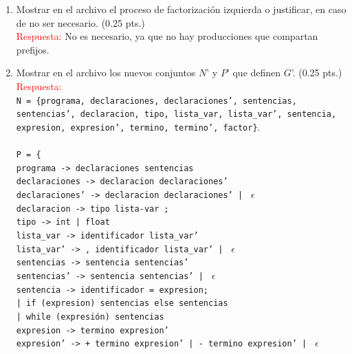 \documentclass[11pt]{report}
\begin{document}
\begin{enumerate}
\begin{enumerate}[label=\alph*.]
\begin{tabular}{ |p{13cm}|l| }
  \texttt{termino' -> * factor termino' |} / \texttt{factor termino' |} $\epsilon$. & $A'$ \texttt{->} $\alpha A'$ $|$ $\epsilon$ \\
  \hline
\end{tabular} \\
      \item Mostrar en el archivo el proceso de factorización izquierda o justificar, en caso de
  no ser necesario. (0.25 pts.) \\
        \textcolor{red}{Respuesta:} No es necesario, ya que no hay producciones que compartan prefijos.
      \item Mostrar en el archivo los nuevos conjuntos $N$' y $P$' que definen $G$'. (0.25 pts.) \\
        \textcolor{red}{Respuesta:} \\
        \texttt{N = \{programa, declaraciones, declaraciones', sentencias,
        sentencias', declaracion, tipo, lista\_var, lista\_var', sentencia, expresion, expresion',
        termino, termino', factor\}}. \\ \\
        \texttt{P = \{} \\
        \texttt{programa -> declaraciones sentencias} \\
        \texttt{declaraciones -> declaracion declaraciones'} \\
        \texttt{declaraciones' -> declaracion declaraciones' | } $\epsilon$ \\
        \texttt{declaracion -> tipo lista-var ;} \\
        \texttt{tipo -> int | float} \\
        \texttt{lista\_var -> identificador lista\_var'} \\
        \texttt{lista\_var' -> , identificador lista\_var' | } $\epsilon$ \\
        \texttt{sentencias -> sentencia sentencias'} \\
        \texttt{sentencias' -> sentencia sentencias' | } $\epsilon$ \\
        \texttt{sentencia -> identificador = expresion;} \\
        \texttt{| if (expresion) sentencias else sentencias} \\
        \texttt{| while (expresión) sentencias} \\
        \texttt{expresion -> termino expresion'} \\
        \texttt{expresion' -> + termino expresion' | - termino expresion' | } $\epsilon$ \\

\end{enumerate}
\end{enumerate}
\end{document}

